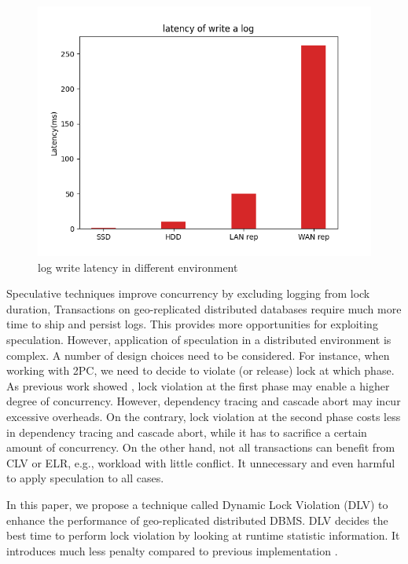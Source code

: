 \documentclass[conference]{IEEEtran}
\begin{document}
\begin{figure}[htbp]
  \centerline{\includegraphics[scale=0.4]{figure/log_write_latency.png}}
  \caption{log write latency in different environment}
  \label{fig:log_write_latency}
\end{figure}

Speculative techniques improve concurrency by excluding logging from lock duration,
Transactions on geo-replicated distributed databases require much more time to ship and persist logs.
This provides more opportunities for exploiting speculation.
However, application of speculation in a distributed environment is complex.
A number of design choices need to be considered.
For instance, when working with 2PC, we need to decide to violate (or release) lock at which phase.
As previous work showed \cite{CLV:conf/sigmod/GraefeLKTV13}, lock violation at the first phase may enable a higher degree of concurrency.
However, dependency tracing and cascade abort may incur excessive overheads.
On the contrary, lock violation at the second phase costs less in dependency tracing and cascade abort, while it has to sacrifice a certain amount of concurrency.
On the other hand, not all transactions can benefit from CLV or ELR, e.g., workload with little conflict.
It unnecessary and even harmful to apply speculation to all cases.

In this paper, we propose a technique called Dynamic Lock Violation (DLV) to enhance the performance of geo-replicated distributed DBMS.
DLV decides the best time to perform lock violation by looking at runtime statistic information.
It introduces much less penalty compared to previous implementation \cite{CLV:conf/sigmod/GraefeLKTV13}.
\end{document}
